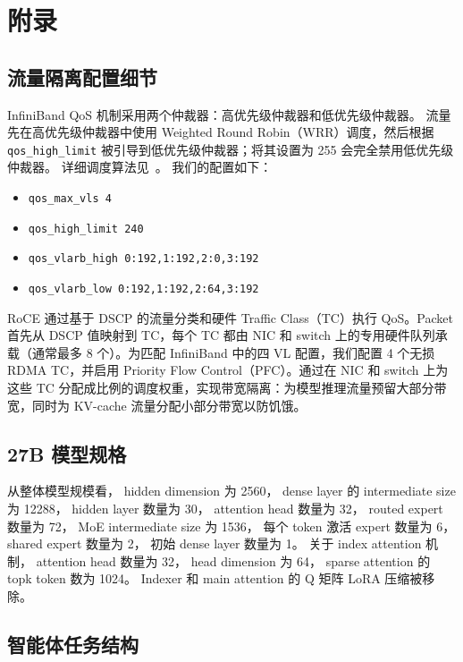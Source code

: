\section{附录}

\subsection{流量隔离配置细节}
\label{sec:traffic-isolation-config}

InfiniBand QoS 机制采用两个仲裁器：高优先级仲裁器和低优先级仲裁器。
流量先在高优先级仲裁器中使用 Weighted Round Robin（WRR）调度，然后根据 \texttt{qos\_high\_limit} 被引导到低优先级仲裁器；将其设置为 255 会完全禁用低优先级仲裁器。
详细调度算法见~\cite{ibta-spec}。
我们的配置如下：
\begin{itemize}[noitemsep]
\item \texttt{qos\_max\_vls 4}
\item \texttt{qos\_high\_limit 240}
\item \texttt{qos\_vlarb\_high 0:192,1:192,2:0,3:192}
\item \texttt{qos\_vlarb\_low 0:192,1:192,2:64,3:192}
\end{itemize}


RoCE 通过基于 DSCP 的流量分类和硬件 Traffic Class（TC）执行 QoS。Packet 首先从 DSCP 值映射到 TC，每个 TC 都由 NIC 和 switch 上的专用硬件队列承载（通常最多 8 个）。为匹配 InfiniBand 中的四 VL 配置，我们配置 4 个无损 RDMA TC，并启用 Priority Flow Control（PFC）。通过在 NIC 和 switch 上为这些 TC 分配成比例的调度权重，实现带宽隔离：为模型推理流量预留大部分带宽，同时为 KV-cache 流量分配小部分带宽以防饥饿。


\subsection{27B 模型规格}
\label{sec:27b-model-specs}

从整体模型规模看，
hidden dimension 为 2560，
dense layer 的 intermediate size 为 12288，
hidden layer 数量为 30，
attention head 数量为 32，
routed expert 数量为 72，
MoE intermediate size 为 1536，
每个 token 激活 expert 数量为 6，
shared expert 数量为 2，
初始 dense layer 数量为 1。
关于 index attention 机制，
attention head 数量为 32，
head dimension 为 64，
sparse attention 的 topk token 数为 1024。
Indexer 和 main attention 的 Q 矩阵 LoRA 压缩被移除。


\subsection{智能体任务结构}
\label{sec:agent-task-structure}

